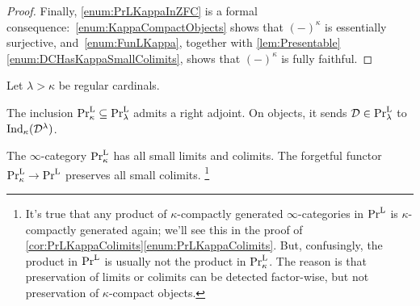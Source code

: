 \begin{proof}
	Finally, \cref{enum:PrLKappaInZFC} is a formal consequence:~\cref{enum:KappaCompactObjects} shows that $(-)^\kappa$ is essentially surjective, and~\cref{enum:FunLKappa}, together with \cref{lem:Presentable}\cref{enum:DCHasKappaSmallColimits}, shows that $(-)^\kappa$ is fully faithful.
\end{proof}
\begin{cor}\label{cor:PrLKappaColimits}
	Let $\lambda >\kappa$ be regular cardinals.
	\begin{alphanumerate}
		\item The inclusion $\mathrm{Pr}_\kappa^{\mathrm{L}}\subseteq \mathrm{Pr}_\lambda^{\mathrm{L}}$ admits a right adjoint. On objects, it sends $\mathcal{D}\in\mathrm{Pr}_\lambda^{\mathrm{L}}$ to $\mathrm{Ind}_\kappa(\mathcal{D}^\lambda)$.\label{enum:PrLKappaLambda}
		\item The $\infty$-category $\mathrm{Pr}_\kappa^{\mathrm{L}}$ has all small limits and colimits. The forgetful functor $\mathrm{Pr}_\kappa^{\mathrm{L}}\rightarrow \mathrm{Pr}^{\mathrm{L}}$ preserves all small colimits.\label{enum:PrLKappaColimits}%
		\footnote{\label{footnote:ProductsInPrLKappa}It's true that any product of $\kappa$-compactly generated $\infty$-categories in $\mathrm{Pr}^{\mathrm{L}}$ is $\kappa$-compactly generated again; we'll see this in the proof of \cref{cor:PrLKappaColimits}\cref{enum:PrLKappaColimits}. But, confusingly, the product in $\mathrm{Pr}^{\mathrm{L}}$ is usually not the product in $\mathrm{Pr}_\kappa^{\mathrm{L}}$. The reason is that preservation of limits or colimits can be detected factor-wise, but not preservation of $\kappa$-compact objects.}
	\end{alphanumerate}
\end{cor}
